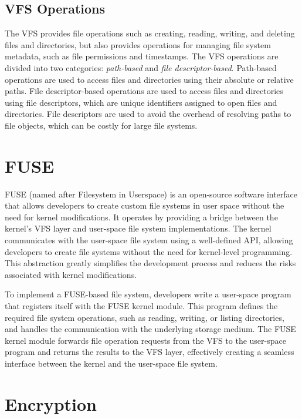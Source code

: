 \subsection{VFS Operations}\label{subsec:vfs-operations}

The VFS provides file operations such as creating, reading, writing, and deleting files and directories, but also provides operations for managing file system metadata, such as file permissions and timestamps.
The VFS operations are divided into two categories: \textit{path-based} and \textit{file descriptor-based}.
Path-based operations are used to access files and directories using their absolute or relative paths.
File descriptor-based operations are used to access files and directories using file descriptors, which are unique identifiers assigned to open files and directories.
File descriptors are used to avoid the overhead of resolving paths to file objects, which can be costly for large file systems.

\section{FUSE}\label{sec:fuse}

FUSE (named after Filesystem in Userspace) is an open-source software interface that allows developers to create custom file systems in user space without the need for kernel modifications.
It operates by providing a bridge between the kernel's VFS layer and user-space file system implementations.
The kernel communicates with the user-space file system using a well-defined API, allowing developers to create file systems without the need for kernel-level programming.
This abstraction greatly simplifies the development process and reduces the risks associated with kernel modifications.

To implement a FUSE-based file system, developers write a user-space program that registers itself with the FUSE kernel module.
This program defines the required file system operations, such as reading, writing, or listing directories, and handles the communication with the underlying storage medium.
The FUSE kernel module forwards file operation requests from the VFS to the user-space program and returns the results to the VFS layer, effectively creating a seamless interface between the kernel and the user-space file system.

\section{Encryption}\label{sec:encryption-approaches}

